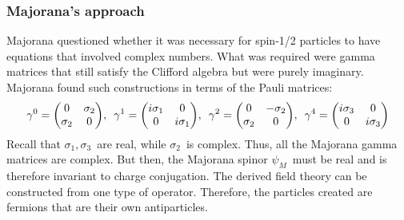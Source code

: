 \begin{frame}
\frametitle{Majorana's approach}
Majorana questioned whether it was necessary for spin-1/2 particles to have equations that involved complex numbers. What was required were gamma matrices that still satisfy the Clifford algebra but were purely imaginary. Majorana found such constructions in terms of the Pauli matrices:
\[
\gamma^0 = \mqty(0 & \sigma_2 \\ \sigma_2 & 0), \,\,\,
\gamma^1 = \mqty(i \sigma_1 & 0 \\ 0 & i \sigma_1), \,\,\,
\gamma^2 = \mqty(0 & -\sigma_2 \\ \sigma_2 & 0), \,\,\,
\gamma^4 = \mqty(i \sigma_3 & 0 \\ 0 & i \sigma_3)
\]
Recall that $\sigma_1, \sigma_3$~are real, while $\sigma_2$~is complex. Thus, all the Majorana gamma matrices are complex. But then, the Majorana spinor $\psi_M$~must be real \alert{and is therefore invariant to charge conjugation}. The derived field theory can be constructed from one type of operator. Therefore, the particles created \alert{are fermions that are their own antiparticles}.
\end{frame}
%
%
